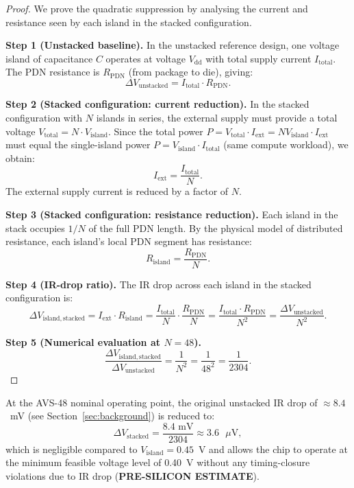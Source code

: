 \begin{proof}
We prove the quadratic suppression by analysing the current and
resistance seen by each island in the stacked configuration.

\medskip
\noindent\textbf{Step 1 (Unstacked baseline).}
In the unstacked reference design, one voltage island of capacitance
$C$ operates at voltage $V_\mathrm{dd}$ with total supply current
$I_\mathrm{total}$.  The PDN resistance is $R_\mathrm{PDN}$ (from
package to die), giving:
\[
  \Delta V_\mathrm{unstacked} = I_\mathrm{total} \cdot R_\mathrm{PDN}.
\]

\medskip
\noindent\textbf{Step 2 (Stacked configuration: current reduction).}
In the stacked configuration with $N$ islands in series, the external
supply must provide a total voltage $V_\mathrm{total} = N \cdot
V_\mathrm{island}$.  Since the total power $P = V_\mathrm{total} \cdot
I_\mathrm{ext} = N V_\mathrm{island} \cdot I_\mathrm{ext}$ must equal
the single-island power $P = V_\mathrm{island} \cdot I_\mathrm{total}$
(same compute workload), we obtain:
\[
  I_\mathrm{ext} = \frac{I_\mathrm{total}}{N}.
\]
The external supply current is reduced by a factor of $N$.

\medskip
\noindent\textbf{Step 3 (Stacked configuration: resistance reduction).}
Each island in the stack occupies $1/N$ of the full PDN length.  By
the physical model of distributed resistance, each island's local PDN
segment has resistance:
\[
  R_\mathrm{island} = \frac{R_\mathrm{PDN}}{N}.
\]

\medskip
\noindent\textbf{Step 4 (IR-drop ratio).}
The IR drop across each island in the stacked configuration is:
\[
  \Delta V_\mathrm{island,stacked}
  = I_\mathrm{ext} \cdot R_\mathrm{island}
  = \frac{I_\mathrm{total}}{N} \cdot \frac{R_\mathrm{PDN}}{N}
  = \frac{I_\mathrm{total} \cdot R_\mathrm{PDN}}{N^2}
  = \frac{\Delta V_\mathrm{unstacked}}{N^2}.
\]

\medskip
\noindent\textbf{Step 5 (Numerical evaluation at $N = 48$).}
\[
  \frac{\Delta V_\mathrm{island,stacked}}{\Delta V_\mathrm{unstacked}}
  = \frac{1}{N^2} = \frac{1}{48^2} = \frac{1}{2304}.
\]
\end{proof}

\begin{corollary}
\label{cor:ir_drop_nominal}
At the AVS-48 nominal operating point, the original unstacked
IR drop of $\approx 8.4$~mV (see Section~\ref{sec:background}) is
reduced to:
\[
  \Delta V_\mathrm{stacked} = \frac{8.4\text{ mV}}{2304} \approx 3.6\text{ }\mu\text{V},
\]
which is negligible compared to $V_\mathrm{island} = 0.45$~V and
allows the chip to operate at the minimum feasible voltage level of
0.40~V without any timing-closure violations due to IR drop
(\textbf{PRE-SILICON ESTIMATE}).
\end{corollary}


